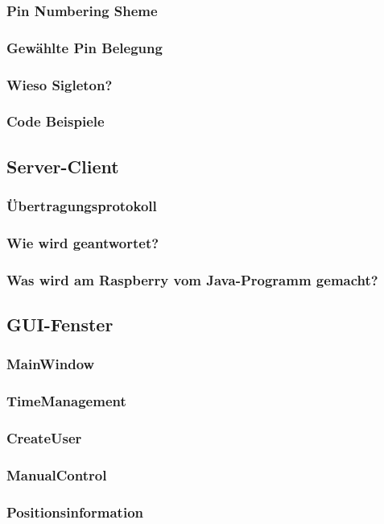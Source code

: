 \subsubsection{Pin Numbering Sheme}
\subsubsection{Gewählte Pin Belegung}
\subsubsection{Wieso Sigleton?}
\subsubsection{Code Beispiele}
\subsection{Server-Client}
\subsubsection{Übertragungsprotokoll}
\subsubsection{Wie wird geantwortet?}
\subsubsection{Was wird am Raspberry vom Java-Programm gemacht?}
\subsection{GUI-Fenster}
\subsubsection{MainWindow}
\subsubsection{TimeManagement}
\subsubsection{CreateUser}
\subsubsection{ManualControl}
\subsubsection{Positionsinformation}
